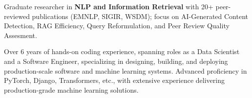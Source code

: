 \documentclass[]{resume-openfont}
\begin{document}
\begin{bullets}[leftmargin=*]
    \item Graduate researcher in \textbf{\color{bodytext}NLP and Information Retrieval} with 20+ peer-reviewed publications (EMNLP, SIGIR, WSDM); focus on AI-Generated Content Detection, RAG Efficiency, Query Reformulation, and Peer Review Quality Assesment. 
    
    \item Over 6 years of hands-on coding experience, spanning roles as a Data Scientist and a Software Engineer, specializing in designing, building, and deploying production-scale software and machine learning systems. Advanced proficiency in PyTorch, Django, Transformers, etc., with extensive experience delivering production-grade machine learning solutions.
\end{bullets}

\sectionsep



\end{document}
